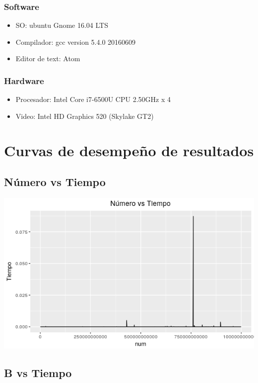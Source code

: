\documentclass[12pt,letterpaper]{scrartcl}
\begin{document}
\subsubsection{Software}
\begin{itemize}
\item  SO: ubuntu Gnome 16.04 LTS
\item Compilador: gcc version 5.4.0 20160609 
\item Editor de text: Atom
\end{itemize}

\subsubsection{Hardware}
\begin{itemize}
\item Procesador: Intel Core i7-6500U CPU  2.50GHz x 4 
\item Video: Intel HD Graphics 520 (Skylake GT2) 
\end{itemize}

\newpage


\section{Curvas de desempeño de resultados}

\subsection{Número vs Tiempo}

\begin{center}
\includegraphics[scale=1]{NumvsTiempo.png} 
\end{center}

\newpage
\subsection{B vs Tiempo}
\end{document}
